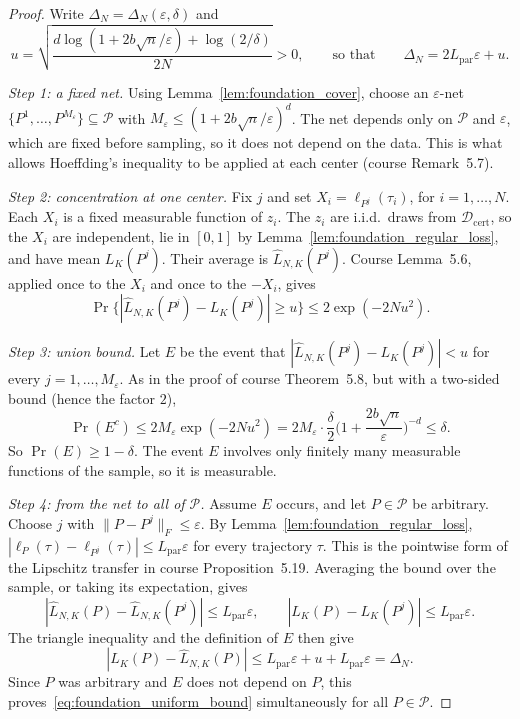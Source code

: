 \begin{proof}
Write $\Delta_N=\Delta_N(\varepsilon,\delta)$ and
\[
 u=\sqrt{\frac{d\log(1+2b\sqrt n/\varepsilon)+\log(2/\delta)}{2N}}>0,
 \qquad\text{so that}\qquad \Delta_N=2L_{\mathrm{par}}\varepsilon+u .
\]

\emph{Step 1: a fixed net.} Using Lemma~\ref{lem:foundation_cover}, choose
an $\varepsilon$-net $\{P^1,\ldots,P^{M_\varepsilon}\}\subseteq\mathcal P$
with $M_\varepsilon\le(1+2b\sqrt n/\varepsilon)^d$. The net depends only on $\mathcal P$ and
$\varepsilon$, which are fixed before sampling, so it does not depend on the
data. This is what allows Hoeffding's inequality to be applied at each
center (course Remark~5.7).

\emph{Step 2: concentration at one center.} Fix $j$ and set
$X_i=\ell_{P^j}(\tau_i)$, for $i=1,\ldots,N$. Each $X_i$ is a fixed
measurable function of $z_i$. The $z_i$ are i.i.d.\ draws from
$\mathcal D_{\mathrm{cert}}$, so the $X_i$ are independent, lie in $[0,1]$
by Lemma~\ref{lem:foundation_regular_loss}, and have mean $L_K(P^j)$. Their
average is $\widehat L_{N,K}(P^j)$. Course Lemma~5.6, applied once to the
$X_i$ and once to the $-X_i$, gives
\[
 \Pr\big\{|\widehat L_{N,K}(P^j)-L_K(P^j)|\ge u\big\}
 \le2\exp(-2Nu^2).
\]

\emph{Step 3: union bound.} Let $E$ be the event that
$|\widehat L_{N,K}(P^j)-L_K(P^j)|<u$ for every $j=1,\ldots,M_\varepsilon$.
As in the proof of course Theorem~5.8, but with a two-sided bound (hence
the factor $2$),
\[
 \Pr(E^c)\le2M_\varepsilon\exp(-2Nu^2)
 =2M_\varepsilon\cdot\frac{\delta}{2}
   \Big(1+\frac{2b\sqrt n}{\varepsilon}\Big)^{-d}
 \le\delta .
\]
So $\Pr(E)\ge1-\delta$. The event $E$ involves only finitely many
measurable functions of the sample, so it is measurable.

\emph{Step 4: from the net to all of $\mathcal P$.} Assume $E$ occurs, and
let $P\in\mathcal P$ be arbitrary. Choose $j$ with
$\|P-P^j\|_F\le\varepsilon$. By Lemma~\ref{lem:foundation_regular_loss},
$|\ell_P(\tau)-\ell_{P^j}(\tau)|\le L_{\mathrm{par}}\varepsilon$ for every
trajectory $\tau$. This is the pointwise form of the Lipschitz transfer in
course Proposition~5.19. Averaging the bound over the sample, or taking its
expectation, gives
\[
 |\widehat L_{N,K}(P)-\widehat L_{N,K}(P^j)|\le L_{\mathrm{par}}\varepsilon,
 \qquad
 |L_K(P)-L_K(P^j)|\le L_{\mathrm{par}}\varepsilon .
\]
The triangle inequality and the definition of $E$ then give
\[
 |L_K(P)-\widehat L_{N,K}(P)|
 \le L_{\mathrm{par}}\varepsilon+u+L_{\mathrm{par}}\varepsilon=\Delta_N .
\]
Since $P$ was arbitrary and $E$ does not depend on $P$, this
proves~\eqref{eq:foundation_uniform_bound} simultaneously for all
$P\in\mathcal P$.


\end{proof}
